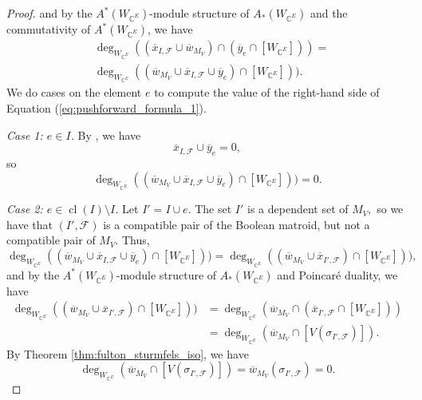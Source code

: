 \documentclass{amsart}
\theoremstyle{plain}
\theoremstyle{definition}
\newcommand{\cl}{\operatorname{cl}}
\begin{document}
\begin{proof}
and by the $A^*(W_{\mathbb{C}^E})$-module structure of $A_*(W_{\mathbb{C}^E})$ and the commutativity of $A^*(W_{\mathbb{C}^E})$, we have
\begin{equation}
\label{eq:pushforward_formula_1}
\begin{split}
& \deg_{W_{\mathbb{C}^E}}((\overline{x}_{I, \mathscr{F}} \cup \overline{w}_{M_V}) \cap (\overline{y}_e \cap [W_{\mathbb{C}^E}])) =  \\ & \deg_{W_{\mathbb{C}^E}}((\overline{w}_{M_V} \cup \overline{x}_{I, \mathscr{F}} \cup \overline{y}_e)\cap [W_{\mathbb{C}^E}])).
\end{split}
\end{equation}
We do cases on the element $e$ to compute the value of the right-hand side of Equation (\ref{eq:pushforward_formula_1}).

\noindent
\textit{Case 1: $e \in I$.} By \cite[Lemma 2.11]{semismall}, we have
\[\overline{x}_{I, \mathscr{F}} \cup \overline{y}_e =  0,\]
so
\[\deg_{W_{\mathbb{C}^E}}((\overline{w}_{M_V} \cup \overline{x}_{I, \mathscr{F}} \cup \overline{y}_e)\cap [W_{\mathbb{C}^E}])) = 0.\]

\noindent
\textit{Case 2: $e \in \cl(I) \setminus I$.} Let $I' = I \cup e.$ The set $I'$ is a dependent set of $M_V,$ so we have that $(I', \mathscr{F})$ is a compatible pair of the Boolean matroid, but not a compatible pair of $M_V.$
Thus,
\begin{equation*}
\deg_{W_{\mathbb{C}^E}}((\overline{w}_{M_V} \cup \overline{x}_{I, \mathscr{F}} \cup \overline{y}_e)\cap [W_{\mathbb{C}^E}])) = \deg_{W_{\mathbb{C}^E}}((\overline{w}_{M_V}
\cup \overline{x}_{I', \mathscr{F}})\cap [W_{\mathbb{C}^E}])),
\end{equation*}
and by the $A^*(W_{\mathbb{C}^E})$-module structure of $A_*(W_{\mathbb{C}^E})$ and Poincar\'e duality, we have
\begin{equation*}
\begin{split}
\deg_{W_{\mathbb{C}^E}}((\overline{w}_{M_V}
\cup \overline{x}_{I', \mathscr{F}})\cap [W_{\mathbb{C}^E}])) & = \deg_{W_{\mathbb{C}^E}}(\overline{w}_{M_V} \cap (\overline{x}_{I', \mathscr{F}}\cap [W_{\mathbb{C}^E}])) \\ & = \deg_{W_{\mathbb{C}^E}}(\overline{w}_{M_V} \cap [V(\sigma_{I', \mathscr{F}})]).
\end{split}
\end{equation*}
By Theorem \ref{thm:fulton_sturmfels_iso}, we have
\[\deg_{W_{\mathbb{C}^E}}(\overline{w}_{M_V} \cap [V(\sigma_{I', \mathscr{F}})]) = \overline{w}_{M_V}(\sigma_{I', \mathscr{F}}) = 0.\]


\end{proof}
\end{document}
